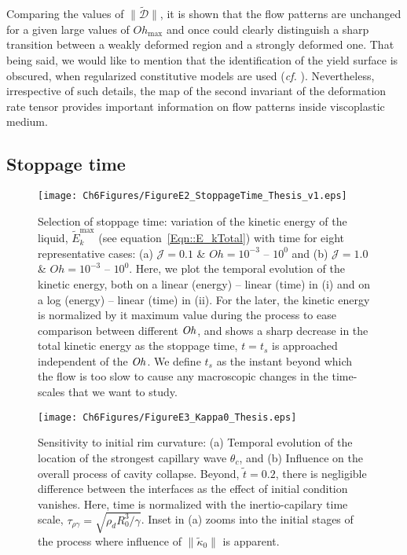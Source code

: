 \begin{subappendices}
Comparing the values of $\|\boldsymbol{\tilde{\mathcal{D}}}\|$, it is shown that the flow patterns are unchanged for a given large values of $Oh_{\text{max}}$ and once could clearly distinguish a sharp transition between a weakly deformed region and a strongly deformed one. That being said, we would like to mention that the identification of the yield surface is obscured, when regularized constitutive models are used (\textit{cf.} \citep{frigaard2005usage}). Nevertheless, irrespective of such details, the map of the second invariant of the deformation rate tensor provides important information on flow patterns inside viscoplastic medium.

\subsection{Stoppage time}\label{App::StoppageTime}

\begin{figure}
	\centering
	\texttt{[image: Ch6Figures/FigureE2\_StoppageTime\_Thesis\_v1.eps]}
	\caption{Selection of stoppage time: variation of the kinetic energy of the liquid, $\tilde E_k^{\text{max}}$ (see equation~\eqref{Eqn::E_kTotal}) with time for eight representative cases: (a) $\mathcal{J} = 0.1$ \& $Oh = 10^{-3}$ -- $10^0$ and (b) $\mathcal{J} = 1.0$  \& $Oh = 10^{-3}$ -- $10^0$. Here, we plot the temporal evolution of the kinetic energy, both on a linear (energy) -- linear (time) in (i) and on a log (energy) -- linear (time) in (ii). For the later, the kinetic energy is normalized by it maximum value during the process to ease comparison between different $\mathit{Oh}$, and shows a sharp decrease in the total kinetic energy as the stoppage time, $t = t_s$ is approached independent of the $\mathit{Oh}$. We define $t_s$ as the instant beyond which the flow is too slow to cause any macroscopic changes in the time-scales that we want to study.}
	\label{fig:StoppageTime}
\end{figure}

\begin{sidewaysfigure}
	\centering
	\texttt{[image: Ch6Figures/FigureE3\_Kappa0\_Thesis.eps]}
	\caption{Sensitivity to initial rim curvature: (a) Temporal evolution of the location of the strongest capillary wave $\theta_c$, and (b) Influence on the overall process of cavity collapse. Beyond, $\tilde t = 0.2$, there is negligible difference between the interfaces as the effect of initial condition vanishes. Here, time is normalized with the inertio-capilary time scale, $\tau_{\rho\gamma} = \sqrt{\rho_d R_0^3/\gamma}$. Inset in (a) zooms into the initial stages of the process where influence of $\|\tilde \kappa_0\|$ is apparent.}
	\label{fig:kappa0}
\end{sidewaysfigure}


\end{subappendices}
